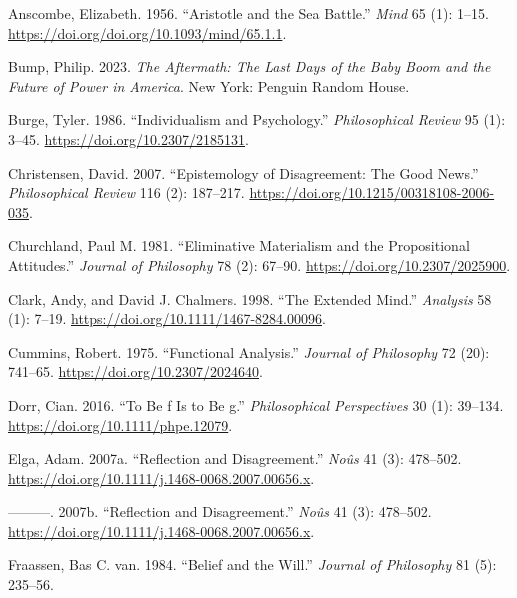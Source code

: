 \documentclass[
  12pt,
  letterpaper,
  DIV=11,
  numbers=noendperiod]{scrartcl}
\newlength{\cslhangindent}
\newenvironment{CSLReferences}[2] %
 {\begin{list}{}{%
  \setlength{\itemindent}{0pt}
  \setlength{\leftmargin}{0pt}
  \setlength{\parsep}{0pt}
  \ifodd #1
   \setlength{\leftmargin}{\cslhangindent}
   \setlength{\itemindent}{-1\cslhangindent}
  \fi
  \setlength{\itemsep}{#2\baselineskip}}}
 {\end{list}}
\begin{document}
\label{refs}
\begin{CSLReferences}{1}{0}
Anscombe, Elizabeth. 1956. {``Aristotle and the Sea Battle.''}
\emph{Mind} 65 (1): 1--15.
\url{https://doi.org/doi.org/10.1093/mind/65.1.1}.

Bump, Philip. 2023. \emph{The Aftermath: The Last Days of the Baby Boom
and the Future of Power in America}. New York: Penguin Random House.

Burge, Tyler. 1986. {``Individualism and Psychology.''}
\emph{Philosophical Review} 95 (1): 3--45.
\url{https://doi.org/10.2307/2185131}.

Christensen, David. 2007. {``Epistemology of Disagreement: The Good
News.''} \emph{Philosophical Review} 116 (2): 187--217.
\url{https://doi.org/10.1215/00318108-2006-035}.

Churchland, Paul M. 1981. {``Eliminative Materialism and the
Propositional Attitudes.''} \emph{Journal of Philosophy} 78 (2): 67--90.
\url{https://doi.org/10.2307/2025900}.

Clark, Andy, and David J. Chalmers. 1998. {``The Extended Mind.''}
\emph{Analysis} 58 (1): 7--19.
\url{https://doi.org/10.1111/1467-8284.00096}.

Cummins, Robert. 1975. {``Functional Analysis.''} \emph{Journal of
Philosophy} 72 (20): 741--65. \url{https://doi.org/10.2307/2024640}.

Dorr, Cian. 2016. {``To Be f Is to Be g.''} \emph{Philosophical
Perspectives} 30 (1): 39--134. \url{https://doi.org/10.1111/phpe.12079}.

Elga, Adam. 2007a. {``Reflection and Disagreement.''} \emph{No{û}s} 41
(3): 478--502. \url{https://doi.org/10.1111/j.1468-0068.2007.00656.x}.

---------. 2007b. {``Reflection and Disagreement.''} \emph{Noûs} 41 (3):
478--502. \url{https://doi.org/10.1111/j.1468-0068.2007.00656.x}.

Fraassen, Bas C. van. 1984. {``Belief and the Will.''} \emph{Journal of
Philosophy} 81 (5): 235--56.


\end{CSLReferences}
\end{document}
